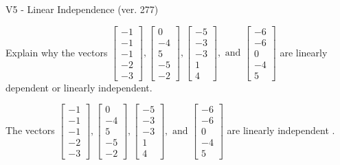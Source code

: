 \begin{exercise}
  \begin{exerciseTitle}V5 - Linear Independence (ver. 277)\end{exerciseTitle}
  \begin{exerciseStatement}
    Explain why the vectors \(\left[\begin{array}{r}
-1 \\
-1 \\
-1 \\
-2 \\
-3
\end{array}\right] , \left[\begin{array}{r}
0 \\
-4 \\
5 \\
-5 \\
-2
\end{array}\right] , \left[\begin{array}{r}
-5 \\
-3 \\
-3 \\
1 \\
4
\end{array}\right] , \text{ and } \left[\begin{array}{r}
-6 \\
-6 \\
0 \\
-4 \\
5
\end{array}\right]\) are linearly dependent or linearly independent.	


  \end{exerciseStatement}
  \begin{exerciseAnswer}
   The vectors \(\left[\begin{array}{r}
-1 \\
-1 \\
-1 \\
-2 \\
-3
\end{array}\right] , \left[\begin{array}{r}
0 \\
-4 \\
5 \\
-5 \\
-2
\end{array}\right] , \left[\begin{array}{r}
-5 \\
-3 \\
-3 \\
1 \\
4
\end{array}\right] , \text{ and } \left[\begin{array}{r}
-6 \\
-6 \\
0 \\
-4 \\
5
\end{array}\right]\) are 
  	 linearly independent  .
  


  \end{exerciseAnswer}
\end{exercise}